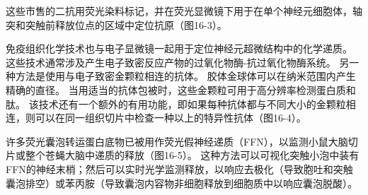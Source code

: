\begin{proposition}[神经解剖学导航术语]
	\quad \quad 这些市售的二抗用荧光染料标记，并在荧光显微镜下用于在单个神经元细胞体，轴突和突触前释放位点的区域中定位抗原（图16-3）。
	
	\quad \quad 免疫组织化学技术也与电子显微镜一起用于定位神经元超微结构中的化学递质。
	这些技术通常涉及产生电子致密反应产物的过氧化物酶-抗过氧化物酶系统。
	另一种方法是使用与电子致密金颗粒相连的抗体。
	胶体金球体可以在纳米范围内产生精确的直径。
	当用适当的抗体包被时，这些金颗粒可用于高分辨率检测蛋白质和肽。
	该技术还有一个额外的有用功能，即如果每种抗体都与不同大小的金颗粒相连，则可以在同一组织切片中检查一种以上的特异性抗体（图16-4）。
	
	\quad \quad 许多荧光囊泡转运蛋白底物已被用作荧光假神经递质（FFN），以监测小鼠大脑切片或整个苍蝇大脑中递质的释放（图16-5）。
	这种方法可以可视化突触小泡中装有FFN的神经末梢；然后可以实时光学监测释放，以响应去极化（导致胞吐和突触囊泡排空）或苯丙胺（导致囊泡内容物非细胞释放到细胞质中以响应囊泡脱酸）。
	
\end{proposition}



